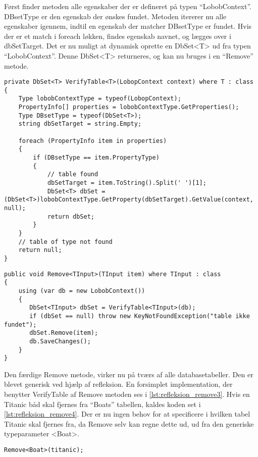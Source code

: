 Først finder metoden alle egenskaber der er defineret på typen \enquote{LobobContext}. DBsetType er den egenskab der ønskes fundet. Metoden itererer nu alle egenskaber igennem, indtil en egenskab der matcher DBsetType er fundet. Hvis der er et match i foreach løkken, findes egenskab navnet, og lægges over i dbSetTarget. Det er nu muligt at dynamisk oprette en DbSet<T> ud fra typen \enquote{LobobContext}. Denne DbSet<T> returneres, og kan nu bruges i en \enquote{Remove} metode.

\begin{lstlisting}[label=lst:refleksion_verifytable, caption={Metode der tjekker om en tabel af typen T findes i databasen.}]
private DbSet<T> VerifyTable<T>(LobopContext context) where T : class
{
    Type lobobContextType = typeof(LobopContext);
    PropertyInfo[] properties = lobobContextType.GetProperties();
    Type DBsetType = typeof(DbSet<T>);
    string dbSetTarget = string.Empty;

    foreach (PropertyInfo item in properties)
    {
        if (DBsetType == item.PropertyType)
        {
            // table found
            dbSetTarget = item.ToString().Split(' ')[1];
            DbSet<T> dbSet = (DbSet<T>)lobobContextType.GetProperty(dbSetTarget).GetValue(context, null);
            return dbSet;
        }
    }
    // table of type not found
    return null;
}
\end{lstlisting}

\begin{lstlisting}[label=lst:refleksion_remove3, caption={Remove metode der kan tage en vilkårlig klasse ind, finde den rette tabel og derefter slette det parametiserede objekt}]
public void Remove<TInput>(TInput item) where TInput : class
{
    using (var db = new LobobContext())
    {
       DbSet<TInput> dbSet = VerifyTable<TInput>(db);
       if (dbSet == null) throw new KeyNotFoundException("table ikke fundet");
       dbSet.Remove(item);
       db.SaveChanges();
    }
} 
\end{lstlisting}

Den færdige Remove metode, virker nu på tværs af alle databasetabeller. Den er blevet generisk ved hjælp af refleksion. En forsimplet implementation, der benytter VerifyTable af Remove metoden ses i \cref{lst:refleksion_remove3}. Hvis en Titanic båd skal fjernes fra \enquote{Boats} tabellen, kaldes koden set i \cref{lst:refleksion_remove4}. Der er nu ingen behov for at specificere i hvilken tabel Titanic skal fjernes fra, da Remove selv kan regne dette ud, ud fra den generiske typeparameter <Boat>.

\begin{lstlisting}[label=lst:refleksion_remove4, caption={Eksempel på brugen af Remove metoden, der fjerner en båd.}]
Remove<Boat>(titanic);
\end{lstlisting}
